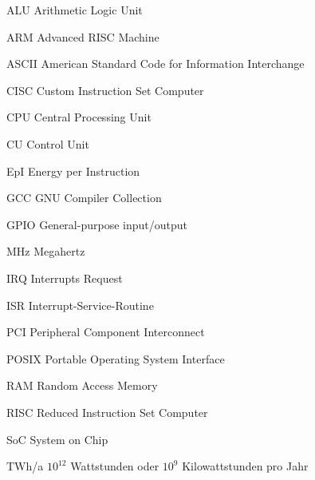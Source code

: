 \begin{abkuerzungen}[MUSTER] %
\item[ALU] Arithmetic Logic Unit
\item[ARM] Advanced RISC Machine
\item[ASCII] American Standard Code for Information Interchange
\item[CISC] Custom Instruction Set Computer
\item[CPU] Central Processing Unit
\item[CU] Control Unit
\item[EpI] Energy per Instruction
\item[GCC] GNU Compiler Collection
\item[GPIO] General-purpose input/output
\item[MHz] Megahertz
\item[IRQ] Interrupts Request
\item[ISR] Interrupt-Service-Routine
\item[PCI] Peripheral Component Interconnect
\item[POSIX] Portable Operating System Interface
\item[RAM] Random Access Memory
\item[RISC] Reduced Instruction Set Computer
\item[SoC] System on Chip
\item[TWh/a] $10^{12}$ Wattstunden oder $10^{9}$ Kilowattstunden pro Jahr


\end{abkuerzungen}
